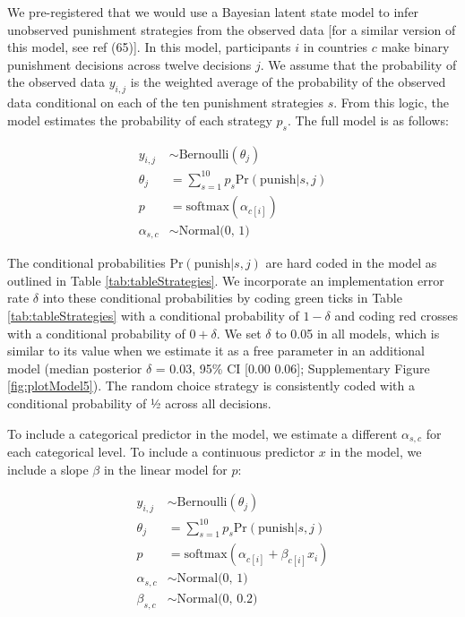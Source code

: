 \documentclass[
  english,
  man, donotrepeattitle,floatsintext]{apa6}
\begin{document}
We pre-registered that we would use a Bayesian latent state model to infer
unobserved punishment strategies from the observed data {[}for a similar version
of this model, see ref (65){]}. In this model, participants \(i\) in
countries \(c\) make binary punishment decisions across twelve decisions \(j\). We
assume that the probability of the observed data \(y_{i,j}\) is the weighted
average of the probability of the observed data conditional on each of the ten
punishment strategies \(s\). From this logic, the model estimates the probability
of each strategy \(p_{s}\). The full model is as follows:

\begin{align}
y_{i,j} &\sim \text{Bernoulli}(\theta_{j}) \\
\theta_{j} &= \sum_{s=1}^{10} p_{s} \text{Pr}(\text{punish}|s,j) \nonumber \\
p &= \text{softmax}(\alpha_{c[i]}) \nonumber \\
\alpha_{s,c} &\sim \text{Normal(0, 1)} \nonumber
\end{align}

The conditional probabilities \(\text{Pr}(\text{punish}|s,j)\) are hard coded in
the model as outlined in Table \ref{tab:tableStrategies}. We incorporate an
implementation error rate \(\delta\) into these conditional probabilities by coding
green ticks in Table \ref{tab:tableStrategies} with a conditional probability
of \(1 - \delta\) and coding red crosses with a conditional probability of
\(0 + \delta\). We set \(\delta\) to 0.05 in all models, which is similar to its
value when we estimate it as a free parameter in an additional model (median
posterior \(\delta\) = 0.03, 95\% CI
{[}0.00 0.06{]};
Supplementary Figure \ref{fig:plotModel5}). The random choice strategy is
consistently coded with a conditional probability of ½ across all decisions.

To include a categorical predictor in the model, we estimate a different
\(\alpha_{s,c}\) for each categorical level. To include a continuous predictor
\(x\) in the model, we include a slope \(\beta\) in the linear model for \(p\):

\begin{align}
y_{i,j} &\sim \text{Bernoulli}(\theta_{j}) \\
\theta_{j} &= \sum_{s=1}^{10} p_{s} \text{Pr}(\text{punish}|s,j) \nonumber \\
p &= \text{softmax}(\alpha_{c[i]} + \beta_{c[i]}x_{i}) \nonumber \\
\alpha_{s,c} &\sim \text{Normal(0, 1)} \nonumber \\
\beta_{s,c} &\sim \text{Normal(0, 0.2)} \nonumber
\end{align}
\end{document}
